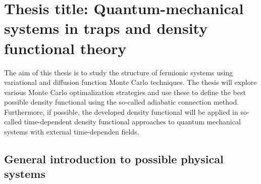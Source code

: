\newcommand{\OP}[1]{{\bf\widehat{#1}}}

\newcommand{\be}{\begin{equation}}

\newcommand{\ee}{\end{equation}}



\pagestyle{plain}

\section*{Thesis title: Quantum-mechanical systems in traps and density functional theory}
The aim of this thesis is to study the structure of fermionic systems using
variational and diffusion function Monte Carlo techniques. The thesis will explore various Monte Carlo
optimalization strategies and use these to define the best possible density functional using the so-called adiabatic connection method.
Furthermore, if possible, the developed density functional will be applied in so-called time-dependent density functional approaches
to quantum mechanical systems with external time-dependen fields.
\subsection*{General introduction to possible physical systems}




